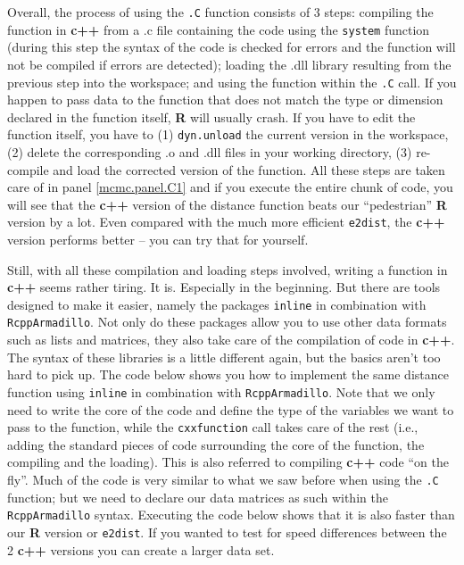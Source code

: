 Overall, the process of using the {\tt .C} function consists of 3 steps: compiling the function in {\bf c++} from a .c file containing the code using the {\tt system} function (during this step the syntax of the code is checked for errors and the function will not be compiled if errors are detected); loading the .dll library resulting from the previous step into the workspace; and using the function within the {\tt .C} call. If you happen to pass data to the function that does not match the type or dimension declared in the function itself, {\bf R} will usually crash. If you have to edit the function itself, you have to (1) {\tt dyn.unload} the current version in the workspace, (2) delete the corresponding .o and .dll files in your working directory, (3) re-compile and load the corrected version of the function. All these steps are taken care of in panel \ref{mcmc.panel.C1} and if you execute the entire chunk of code, you will see that the {\bf c++} version of the distance function beats our ``pedestrian'' {\bf R} version by a lot. Even compared with the much more efficient {\tt e2dist}, the {\bf c++} version performs better -- you can try that for yourself.

Still, with all these compilation and loading steps involved, writing a function in {\bf c++} seems rather tiring. It is. Especially in the beginning. But there are tools designed to make it easier, namely the packages {\tt inline} in combination with {\tt RcppArmadillo}. Not only do these packages allow you to use other data formats such as lists and matrices, they also take care of the compilation of code in {\bf c++}. The syntax of these libraries is a little different again, but the basics aren't too hard to pick up. The code below shows you how to implement the same distance function using {\tt inline} in combination with {\tt RcppArmadillo}. Note that we only need to write the core of the code and define the type of the variables we want to pass to the function, while the {\tt cxxfunction} call takes care of the rest (i.e., adding the standard pieces of code surrounding the core of the function, the compiling and the loading). This is also referred to compiling {\bf c++} code ``on the fly''. Much of the code is very similar to what we saw before when using the {\tt .C} function; but we need to declare our data matrices as such within the {\tt RcppArmadillo} syntax. Executing the code below shows that it is also faster than our {\bf R} version or {\tt e2dist}. If you wanted to test for speed differences between the 2 {\bf c++} versions you can create a larger data set. 

